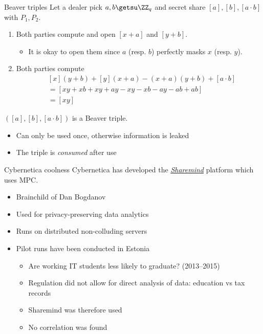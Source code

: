 \begin{frame}{Beaver triples}
  Let a dealer pick $a, b \getsu \ZZ_q$ and secret share $[a], [b], [a \cdot b]$ with $P_1, P_2$.
  \begin{enumerate}[<+(1)->]
    \item Both parties compute and open $[x + a]$ and $[y + b]$.
    \begin{itemize}
      \item It is okay to open them since $a$ (resp. $b$) perfectly masks $x$ (resp. $y$).
    \end{itemize}
    \item Both parties compute
    \begin{align*}
      &[x](y + b) + [y](x + a) - (x+a)(y+b) + [a\cdot b]\\
      &= [xy + xb + xy + ay - xy - xb - ay - ab + ab]\\
      &= [xy]
    \end{align*}
  \end{enumerate}
  \vspace*{-1em}
  \pause
  $([a], [b], [a \cdot b])$ is a Beaver triple.
  \begin{itemize}[<+(1)->]
    \item Can only be used once, otherwise information is leaked
    \item The triple is \emph{consumed} after use
  \end{itemize}
\end{frame}

\begin{frame}{Cybernetica coolness}
  Cybernetica has developed the \href{https://sharemind.cyber.ee}{\textit{Sharemind}} platform which uses MPC.
  \begin{itemize}[<+(1)->]
    \item Brainchild of Dan Bogdanov
    \item Used for privacy-preserving data analytics
    \item Runs on distributed non-colluding servers
    \item Pilot runs have been conducted in Estonia
    \begin{itemize}
      \item Are working IT students less likely to graduate? (2013--2015)
      \item Regulation did not allow for direct analysis of data: education vs tax records
      \item Sharemind was therefore used 
      \item No correlation was found
    \end{itemize}
  \end{itemize}
\end{frame}

